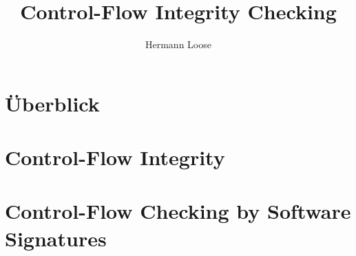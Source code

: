 \documentclass[10pt,twocolumn]{article}
\title{Control-Flow Integrity Checking}
\author{Hermann Loose}
\begin{document}
\maketitle

\section{Überblick}

\section{Control-Flow Integrity}

\section{Control-Flow Checking by Software Signatures}



\end{document}
